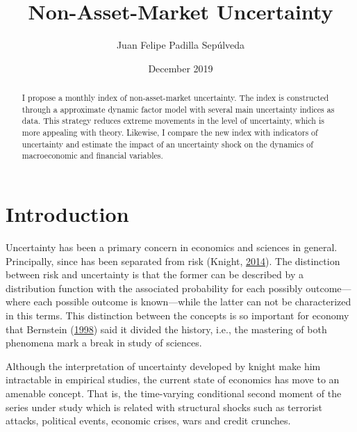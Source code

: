 \documentclass[12pt,twoside]{reedthesis}
\title{Non-Asset-Market Uncertainty}
\author{Juan Felipe Padilla Sepúlveda}
\date{December 2019}
\begin{document}
  \maketitle

\frontmatter %
\pagestyle{empty} %



  \hypersetup{linkcolor=black}
  \setcounter{tocdepth}{2}
  \tableofcontents

  \listoftables

  \listoffigures
  \begin{abstract}
    I propose a monthly index of non-asset-market uncertainty. The index is constructed through a approximate dynamic factor model with several main uncertainty indices as data. This strategy reduces extreme movements in the level of uncertainty, which is more appealing with theory. Likewise, I compare the new index with indicators of uncertainty and estimate the impact of an uncertainty shock on the dynamics of macroeconomic and financial variables.
  \end{abstract}

\mainmatter %
\pagestyle{fancyplain} %

\hypertarget{introduction}{%
\chapter*{Introduction}\label{introduction}}

Uncertainty has been a primary concern in economics and sciences in general. Principally, since has been separated from risk (Knight, \protect\hyperlink{ref-knight:2014}{2014}). The distinction between risk and uncertainty is that the former can be described by a distribution function with the associated probability for each possibly outcome---where each possible outcome is known---while the latter can not be characterized in this terms. This distinction between the concepts is so important for economy that Bernstein (\protect\hyperlink{ref-bernstein:1998}{1998}) said it divided the history, i.e., the mastering of both phenomena mark a break in study of sciences.

Although the interpretation of uncertainty developed by knight make him intractable in empirical studies, the current state of economics has move to an amenable concept. That is, the time-varying conditional second moment of the series under study which is related with structural shocks such as terrorist attacks, political events, economic crises, wars and credit crunches.
\end{document}
